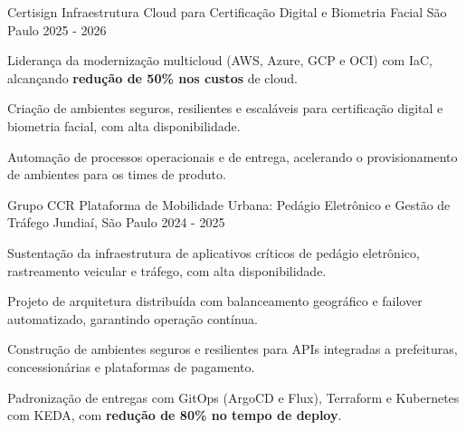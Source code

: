 
\begin{cventries}

  \cventry
    {Certisign} %
    {Infraestrutura Cloud para Certificação Digital e Biometria Facial} %
    {São Paulo} %
    {2025 - 2026} %
    {
      \begin{cvitems} %
        \item {Liderança da modernização multicloud (AWS, Azure, GCP e OCI) com IaC, alcançando \textbf{redução de 50\% nos custos} de cloud.}
        \item {Criação de ambientes seguros, resilientes e escaláveis para certificação digital e biometria facial, com alta disponibilidade.}
        \item {Automação de processos operacionais e de entrega, acelerando o provisionamento de ambientes para os times de produto.}
      \end{cvitems}
    }
  \break

  \cventry
    {Grupo CCR} %
    {Plataforma de Mobilidade Urbana: Pedágio Eletrônico e Gestão de Tráfego} %
    {Jundiaí, São Paulo} %
    {2024 - 2025} %
    {
      \begin{cvitems} %
        \item {Sustentação da infraestrutura de aplicativos críticos de pedágio eletrônico, rastreamento veicular e tráfego, com alta disponibilidade.}
        \item {Projeto de arquitetura distribuída com balanceamento geográfico e failover automatizado, garantindo operação contínua.}
        \item {Construção de ambientes seguros e resilientes para APIs integradas a prefeituras, concessionárias e plataformas de pagamento.}
        \item {Padronização de entregas com GitOps (ArgoCD e Flux), Terraform e Kubernetes com KEDA, com \textbf{redução de 80\% no tempo de deploy}.}
      \end{cvitems}
    }
  \break


\end{cventries}
